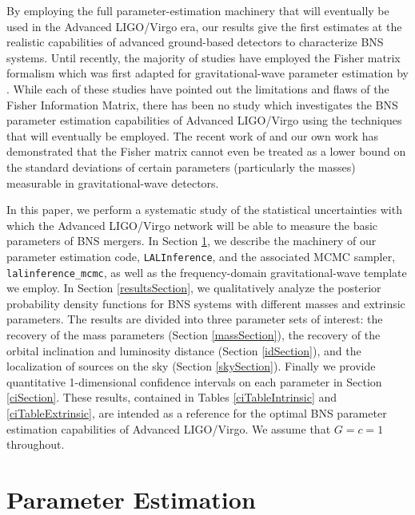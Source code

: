 \documentclass[11pt,a4paper]{emulateapj}
\begin{document}
By employing the full parameter-estimation machinery that will eventually be
used in the Advanced LIGO/Virgo era, our results give the first estimates at the 
realistic capabilities of advanced ground-based detectors to characterize BNS systems.
  Until recently, the majority of studies have employed the Fisher matrix formalism which was 
first adapted for gravitational-wave parameter estimation by \citep{FinnDetection}.
While each of these studies \citep{PoissonWill,CutlerFlanagan,ArunPE} have pointed out the limitations 
and flaws of the Fisher Information Matrix, there has been no study which investigates
the BNS parameter estimation capabilities of Advanced LIGO/Virgo using the techniques
that will eventually be employed.  The recent work of \cite{Vallisneri} and our 
own work \citep{Inadequacies} has demonstrated that the Fisher matrix cannot even
be treated as a lower bound on the standard deviations of certain parameters
(particularly the masses) measurable in gravitational-wave detectors.

In this paper, we perform a systematic study of the statistical uncertainties with
which the Advanced LIGO/Virgo network will be able to measure the basic parameters of 
BNS mergers.  In Section \ref{PEsection}, we describe
the machinery of our parameter estimation code, \texttt{LALInference}, and the associated
MCMC sampler, \texttt{lalinference\_mcmc}, as well as the frequency-domain 
gravitational-wave template we employ.   In Section \ref{resultsSection}, we qualitatively 
analyze the posterior probability density functions for BNS systems with different masses 
and extrinsic parameters.  The results are divided into three parameter sets of interest: the
recovery of the mass parameters (Section \ref{massSection}), the recovery of the orbital
inclination and luminosity distance (Section \ref{idSection}), and the localization of sources 
on the sky (Section \ref{skySection}).   Finally we provide quantitative 1-dimensional confidence
 intervals on each parameter in Section \ref{ciSection}.  These results, contained
 in Tables \ref{ciTableIntrinsic} and \ref{ciTableExtrinsic}, are intended as a reference for the 
 optimal BNS parameter estimation capabilities of Advanced LIGO/Virgo.
   We assume that $G=c=1$ throughout.


\section{Parameter Estimation}
\label{PEsection}
\end{document}
